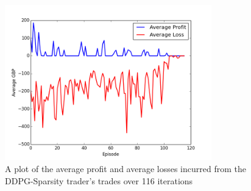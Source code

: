 \documentclass[ %
                    author={Ashwinder Khurana},
                supervisor={Prof Dave Cliff},
                    degree={MEng},
                     title={The Deeply Reinforced Trader},
                  subtitle={},
                      type={enterprise},
                      year={2020} ]{dissertation}
\begin{document}
{\begin{figure}[H] 
	\centering
  	\includegraphics[width=0.8\textwidth]{DDPG-Sparsity-Average-Trade}
  	\caption{A plot of the average profit and average losses incurred from the DDPG-Sparsity trader's trades over 116 iterations }
	\label{fig:DDPG-Sparsity-Average-Trade}  
\end{figure}


}
\end{document}
